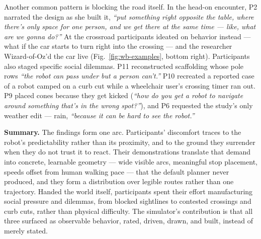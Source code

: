 Another common pattern is blocking the road itself. In the head-on encounter, P2 narrated the design as she built it, \emph{``put something right opposite the table, where there's only space for one person, and we get there at the same time --- like, what are we gonna do?''} At the crossroad participants ideated on behavior instead --- what if the car starts to turn right into the crossing --- and the researcher Wizard-of-Oz'd the car live (Fig.~\ref{fig:wb-examples}, bottom right). Participants also staged specific social dilemmas. P11 reconstructed scaffolding whose pole rows \emph{``the robot can pass under but a person can't.''} P10 recreated a reported case of a robot camped on a curb cut while a wheelchair user's crossing timer ran out. P9 placed cones because they get kicked (\emph{``how do you get a robot to navigate around something that's in the wrong spot?''}), and P6 requested the study's only weather edit --- rain, \emph{``because it can be hard to see the robot.''}

\smallskip\noindent\textbf{Summary.}
The findings form one arc. Participants' discomfort traces to the robot's predictability rather than its proximity, and to the ground they surrender when they do not trust it to react. Their demonstrations translate that demand into concrete, learnable geometry --- wide visible arcs, meaningful stop placement, speeds offset from human walking pace --- that the default planner never produced, and they form a distribution over legible routes rather than one trajectory. Handed the world itself, participants spent their effort manufacturing social pressure and dilemmas, from blocked sightlines to contested crossings and curb cuts, rather than physical difficulty. The simulator's contribution is that all three surfaced as observable behavior, rated, driven, drawn, and built, instead of merely stated.


